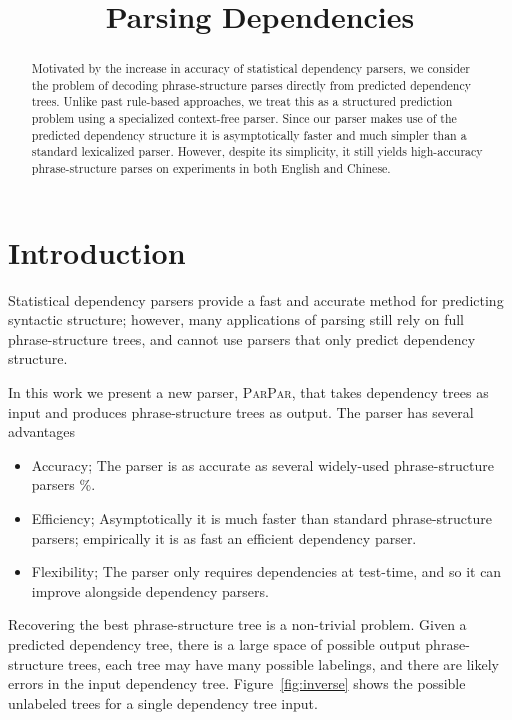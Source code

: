 \documentclass[11pt,letterpaper]{article}
\title{Parsing Dependencies}
\author{}
\date{}
\newcommand{\ParseName}{\textsc{ParPar}}
\begin{document}
\maketitle
\begin{abstract}

  Motivated by the increase in accuracy of statistical dependency
  parsers, we consider the problem of decoding phrase-structure parses
  directly from predicted dependency trees. Unlike past rule-based
  approaches, we treat this as a structured prediction problem using a
  specialized context-free parser. Since our parser makes use of the
  predicted dependency structure it is asymptotically faster and much
  simpler than a standard lexicalized parser. However, despite its
  simplicity, it still yields high-accuracy phrase-structure parses on
  experiments in both English and Chinese.



\end{abstract}

\section{Introduction}

Statistical dependency parsers provide a fast and accurate method for
predicting syntactic structure; however, many applications of parsing still rely on
full phrase-structure trees, and cannot use parsers that only predict
dependency structure. 

In this work we present a new parser, \ParseName, that takes dependency trees as input and produces phrase-structure trees as output. The parser has several advantages

\begin{itemize}
\item Accuracy; The parser is as accurate as several widely-used phrase-structure parsers \%.  
\item Efficiency; Asymptotically it is much faster than standard phrase-structure parsers; empirically it is as fast an efficient dependency parser.

\item Flexibility; The parser only requires dependencies at test-time, and so it can improve alongside dependency parsers.
\end{itemize}

Recovering the best phrase-structure tree is a non-trivial problem. Given a
predicted dependency tree, there is a large space of possible output
phrase-structure trees, each tree may have many possible labelings,
and there are likely errors in the input dependency tree. Figure~\ref{fig:inverse} shows the possible unlabeled trees for a single dependency tree input.
\end{document}
